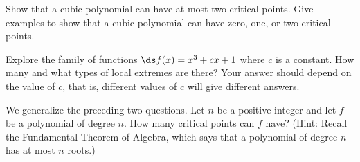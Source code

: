 \begin{exercises}
\begin{exercise} Show that a cubic polynomial can have at most two critical
points. Give examples to show that a cubic polynomial can have zero,
one, or two critical points.
\end{exercise}

\begin{exercise} Explore the family of functions $\ds f(x) = x^3 + cx +1$ where $c$
 is a constant.  How many and what types of local extremes are there?
 Your answer should depend on the value of $c$, that is, different
 values of $c$ will give different answers.
\end{exercise}

\begin{exercise} We generalize the preceding two questions. Let $n$ be a
positive integer and let $f$ be a polynomial of degree $n$. How many
critical points can $f$ have? (Hint: Recall the {\dfont Fundamental
  Theorem of Algebra}, 
which says that a polynomial of degree $n$ has
  at most $n$ roots.)
\end{exercise}

\end{exercises}

